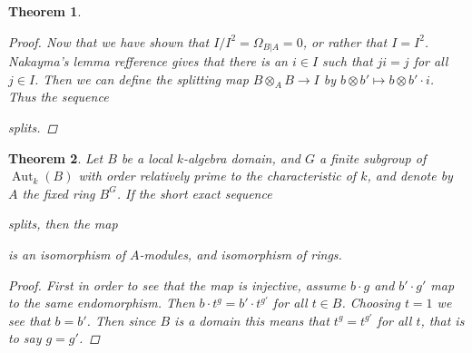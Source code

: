 \documentclass[11pt, a4paper, english]{article}
\numberwithin{prop}{section}
\numberwithin{lemma}{section}
\newtheorem{theorem}{Theorem}
\numberwithin{theorem}{section}
\numberwithin{defin}{section}
\numberwithin{example}{section}
\DeclareMathOperator{\End}{End}
\DeclareMathOperator{\Aut}{Aut}
\begin{document}
\begin{theorem}
\begin{proof}
Now that we have shown that $I/I^2 = \Omega_{B|A} = 0$, or rather that $I = I^2$. Nakayma's lemma {\color{red} refference} gives that there is an $i \in I$ such that $ji = j$ for all $j \in I$. Then we can define the splitting map $B \otimes_A B \to I$ by $b \otimes b' \mapsto b \otimes b' \cdot i$. Thus the sequence 
\begin{center}
\end{center}
splits.
\end{proof}
\end{theorem}

\begin{theorem}
Let $B$ be a local $k$-algebra domain, and $G$ a finite subgroup of $\Aut_k(B)$ with order relatively prime to the characteristic of $k$, and denote by $A$ the fixed ring $B^G$. If the short exact sequence
\begin{center}
\end{center}
splits, then the map
\begin{center}
\end{center}
is an isomorphism of $A$-modules, and isomorphism of rings.

\begin{proof}
First in order to see that the map is injective, assume $b \cdot g$ and $b' \cdot g'$ map to the same endomorphism. Then $b \cdot t^g = b' \cdot t^{g'}$ for all $t \in B$. Choosing $t=1$ we see that $b = b'$. Then since $B$ is a domain this means that $t^g = t^{g'}$ for all $t$, that is to say $g = g'$.


\end{proof}
\end{theorem}
\end{document}
